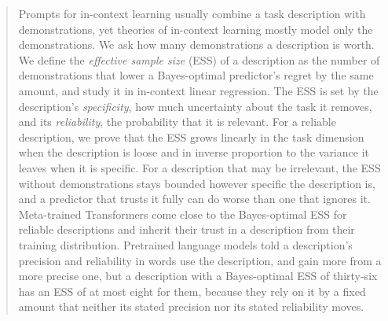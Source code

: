 \documentclass{article}
\begin{document}
\printAffiliationsAndNotice{}

\begin{abstract}
Prompts for in-context learning usually combine a task description with demonstrations, yet theories of in-context learning mostly model only the demonstrations. We ask how many demonstrations a description is worth. We define the \emph{effective sample size} (ESS) of a description as the number of demonstrations that lower a Bayes-optimal predictor's regret by the same amount, and study it in in-context linear regression. The ESS is set by the description's \emph{specificity}, how much uncertainty about the task it removes, and its \emph{reliability}, the probability that it is relevant. For a reliable description, we prove that the ESS grows linearly in the task dimension when the description is loose and in inverse proportion to the variance it leaves when it is specific. For a description that may be irrelevant, the ESS without demonstrations stays bounded however specific the description is, and a predictor that trusts it fully can do worse than one that ignores it. Meta-trained Transformers come close to the Bayes-optimal ESS for reliable descriptions and inherit their trust in a description from their training distribution. Pretrained language models told a description's precision and reliability in words use the description, and gain more from a more precise one, but a description with a Bayes-optimal ESS of thirty-six has an ESS of at most eight for them, because they rely on it by a fixed amount that neither its stated precision nor its stated reliability moves.
\end{abstract}
\end{document}
